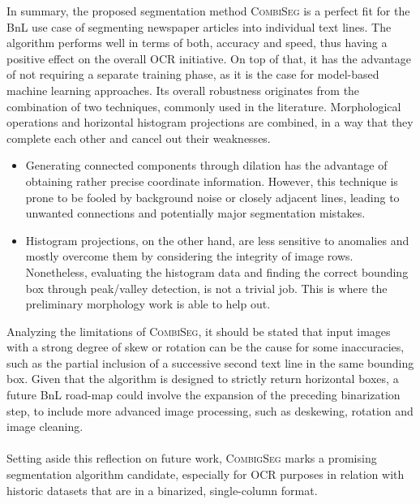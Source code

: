 \documentclass{jdmdh}
\begin{document}
In summary, the proposed segmentation method \textsc{CombiSeg} is a perfect fit for the BnL use case of segmenting newspaper articles into individual text lines. The algorithm performs well in terms of both, accuracy and speed, thus having a positive effect on the overall OCR initiative. On top of that, it has the advantage of not requiring a separate training phase, as it is the case for model-based machine learning approaches. Its overall robustness originates from the combination of two techniques, commonly used in the literature. Morphological operations and horizontal histogram projections are combined, in a way that they complete each other and cancel out their weaknesses. \\
\begin{itemize}
    \item Generating connected components through dilation has the advantage of obtaining rather precise coordinate information. However, this technique is prone to be fooled by background noise or closely adjacent lines, leading to unwanted connections and potentially major segmentation mistakes. \\
    \item Histogram projections, on the other hand, are less sensitive to anomalies and mostly overcome them by considering the integrity of image rows. Nonetheless, evaluating the histogram data and finding the correct bounding box through peak/valley detection, is not a trivial job. This is where the preliminary morphology work is able to help out. \\
\end{itemize}
Analyzing the limitations of \textsc{CombiSeg}, it should be stated that input images with a strong degree of skew or rotation can be the cause for some inaccuracies, such as the partial inclusion of a successive second text line in the same bounding box. Given that the algorithm is designed to strictly return horizontal boxes, a future BnL road-map could involve the expansion of the preceding binarization step, to include more advanced image processing, such as deskewing, rotation and image cleaning.
\\ \\
Setting aside this reflection on future work, \textsc{CombigSeg} marks a promising segmentation algorithm candidate, especially for OCR purposes in relation with historic datasets that are in a binarized, single-column format.


\end{document}
